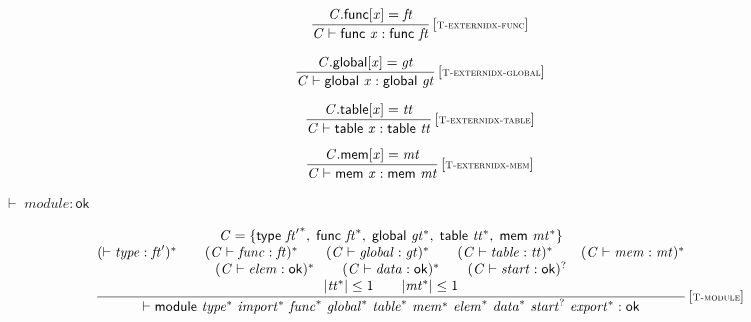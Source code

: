 $$
\begin{array}{@{}c@{}}\displaystyle
\frac{
{\mathit{C}}.\mathsf{func}[{\mathit{x}}] = {\mathit{ft}}
}{
{\mathit{C}} \vdash \mathsf{func}~{\mathit{x}} : \mathsf{func}~{\mathit{ft}}
} \, {[\textsc{\scriptsize T{-}externidx{-}func}]}
\qquad
\end{array}
$$

$$
\begin{array}{@{}c@{}}\displaystyle
\frac{
{\mathit{C}}.\mathsf{global}[{\mathit{x}}] = {\mathit{gt}}
}{
{\mathit{C}} \vdash \mathsf{global}~{\mathit{x}} : \mathsf{global}~{\mathit{gt}}
} \, {[\textsc{\scriptsize T{-}externidx{-}global}]}
\qquad
\end{array}
$$

$$
\begin{array}{@{}c@{}}\displaystyle
\frac{
{\mathit{C}}.\mathsf{table}[{\mathit{x}}] = {\mathit{tt}}
}{
{\mathit{C}} \vdash \mathsf{table}~{\mathit{x}} : \mathsf{table}~{\mathit{tt}}
} \, {[\textsc{\scriptsize T{-}externidx{-}table}]}
\qquad
\end{array}
$$

$$
\begin{array}{@{}c@{}}\displaystyle
\frac{
{\mathit{C}}.\mathsf{mem}[{\mathit{x}}] = {\mathit{mt}}
}{
{\mathit{C}} \vdash \mathsf{mem}~{\mathit{x}} : \mathsf{mem}~{\mathit{mt}}
} \, {[\textsc{\scriptsize T{-}externidx{-}mem}]}
\qquad
\end{array}
$$

\vspace{1ex}

$\boxed{{ \vdash }\;{\mathit{module}} : \mathsf{ok}}$

$$
\begin{array}{@{}c@{}}\displaystyle
\frac{
\begin{array}{@{}c@{}}
{\mathit{C}} = \{ \begin{array}[t]{@{}l@{}}
\mathsf{type}~{{\mathit{ft}'}^\ast},\; \mathsf{func}~{{\mathit{ft}}^\ast},\; \mathsf{global}~{{\mathit{gt}}^\ast},\; \mathsf{table}~{{\mathit{tt}}^\ast},\; \mathsf{mem}~{{\mathit{mt}}^\ast} \}\end{array}
 \\
({ \vdash }\;{\mathit{type}} : {\mathit{ft}'})^\ast
 \qquad
({\mathit{C}} \vdash {\mathit{func}} : {\mathit{ft}})^\ast
 \qquad
({\mathit{C}} \vdash {\mathit{global}} : {\mathit{gt}})^\ast
 \qquad
({\mathit{C}} \vdash {\mathit{table}} : {\mathit{tt}})^\ast
 \qquad
({\mathit{C}} \vdash {\mathit{mem}} : {\mathit{mt}})^\ast
 \\
({\mathit{C}} \vdash {\mathit{elem}} : \mathsf{ok})^\ast
 \qquad
({\mathit{C}} \vdash {\mathit{data}} : \mathsf{ok})^\ast
 \qquad
({\mathit{C}} \vdash {\mathit{start}} : \mathsf{ok})^?
 \\
{|{{\mathit{tt}}^\ast}|} \leq 1
 \qquad
{|{{\mathit{mt}}^\ast}|} \leq 1
\end{array}
}{
{ \vdash }\;\mathsf{module}~{{\mathit{type}}^\ast}~{{\mathit{import}}^\ast}~{{\mathit{func}}^\ast}~{{\mathit{global}}^\ast}~{{\mathit{table}}^\ast}~{{\mathit{mem}}^\ast}~{{\mathit{elem}}^\ast}~{{\mathit{data}}^\ast}~{{\mathit{start}}^?}~{{\mathit{export}}^\ast} : \mathsf{ok}
} \, {[\textsc{\scriptsize T{-}module}]}
\qquad
\end{array}
$$

